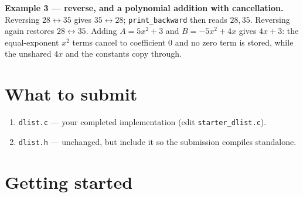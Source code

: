 \documentclass[11pt]{article}
\begin{document}
\textbf{Example 3 --- reverse, and a polynomial addition with cancellation.} Reversing $28 \leftrightarrow 35$ gives $35 \leftrightarrow 28$; \texttt{print\_backward} then reads $28, 35$. Reversing again restores $28 \leftrightarrow 35$. Adding $A = 5x^{2} + 3$ and $B = -5x^{2} + 4x$ gives $4x + 3$: the equal-exponent $x^{2}$ terms cancel to coefficient $0$ and no zero term is stored, while the unshared $4x$ and the constants copy through.

\section{What to submit}

\begin{enumerate}
  \item \texttt{dlist.c} --- your completed implementation (edit \texttt{starter\_dlist.c}).
  \item \texttt{dlist.h} --- unchanged, but include it so the submission compiles standalone.
\end{enumerate}

\section{Getting started}
\end{document}
